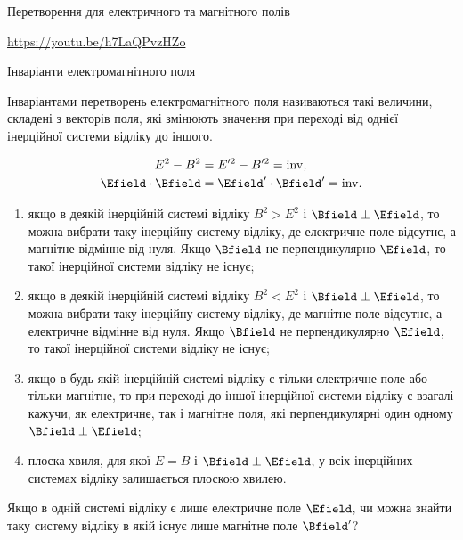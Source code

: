 \documentclass[9pt]{beamer}
\begin{document}
\begin{frame}{Перетворення для електричного та магнітного полів}{}
\begin{overprint}
		\vspace*{5em}

		{\tiny \url{https://youtu.be/h7LaQPvzHZo}}
	\end{overprint}
\end{frame}





\begin{frame}{Інваріанти електромагнітного поля}{}
	\begin{block}{}\justifying\small
		Інваріантами перетворень електромагнітного поля називаються такі величини, складені з векторів поля, які змінюють значення при переході від однієї інерційної системи відліку до іншого.
	\end{block}
	\begin{tcolorbox}[sharp corners, colframe=blue!50!black, colback=white,  top=0pt]
		{\color{blue}
			\begin{align*}
				E^2 - B^2           & = E'^2 - B'^2 = \mathrm{inv},           \\
				\Efield\cdot\Bfield & = \Efield'\cdot\Bfield' = \mathrm{inv}.
			\end{align*}
		}
	\end{tcolorbox}
	\begin{enumerate}\footnotesize
		\item якщо в деякій інерційній системі відліку {\color{red} $ B^2 > E^2 $}  і {\color{blue} $ \Bfield \perp \Efield $}, то можна вибрати таку інерційну систему відліку, де електричне поле відсутнє, а магнітне відмінне від нуля. Якщо $ \Bfield $ не перпендикулярно $ \Efield $, то такої інерційної системи відліку не існує;
		\item  якщо в деякій інерційній системі відліку {\color{red} $ B^2 < E^2 $} і {\color{blue} $ \Bfield \perp \Efield $}, то можна вибрати таку інерційну систему відліку, де магнітне поле відсутнє, а електричне відмінне від нуля. Якщо $ \Bfield $ не перпендикулярно $ \Efield $, то такої інерційної системи відліку не існує;
		\item якщо в будь-якій інерційній системі відліку є тільки електричне поле або тільки магнітне, то при переході до іншої інерційної системи відліку є взагалі кажучи, як електричне, так і магнітне поля, які перпендикулярні один одному {\color{red} $ \Bfield \perp \Efield $};
		\item плоска хвиля, для якої {\color{red} $ E = B $} і {\color{blue} $ \Bfield \perp \Efield $}, у всіх інерційних системах відліку  залишається плоскою хвилею.
	\end{enumerate}{}

	\begin{exampleblock}{}\small
		Якщо в одній системі відліку є лише електричне поле $ \Efield $, чи можна знайти таку систему відліку в якій існує лише магнітне поле $ \Bfield' $?
	\end{exampleblock}
\end{frame}
\end{document}
